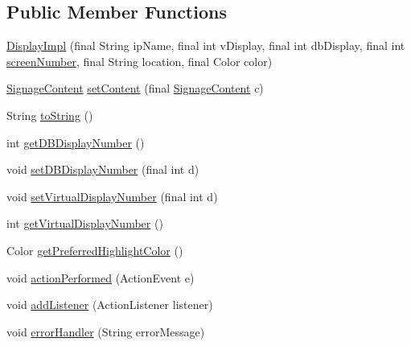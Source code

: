 \subsection*{Public Member Functions}
\begin{DoxyCompactItemize}
\item 
\hyperlink{classgov_1_1fnal_1_1ppd_1_1dd_1_1display_1_1DisplayImpl_acb6974b45a772ac261c72c99d0df724b}{Display\-Impl} (final String ip\-Name, final int v\-Display, final int db\-Display, final int \hyperlink{classgov_1_1fnal_1_1ppd_1_1dd_1_1display_1_1DisplayImpl_ace620614bde13cee492129c27f38db4e}{screen\-Number}, final String location, final Color color)
\item 
\hyperlink{interfacegov_1_1fnal_1_1ppd_1_1dd_1_1signage_1_1SignageContent}{Signage\-Content} \hyperlink{classgov_1_1fnal_1_1ppd_1_1dd_1_1display_1_1DisplayImpl_a39ab9312ab3a54c61403b95b30f7d831}{set\-Content} (final \hyperlink{interfacegov_1_1fnal_1_1ppd_1_1dd_1_1signage_1_1SignageContent}{Signage\-Content} c)
\item 
String \hyperlink{classgov_1_1fnal_1_1ppd_1_1dd_1_1display_1_1DisplayImpl_aa322597e9f586d4a5c4dfb78e2b7e793}{to\-String} ()
\item 
int \hyperlink{classgov_1_1fnal_1_1ppd_1_1dd_1_1display_1_1DisplayImpl_a1b294a2d2cd0b9f51e2489b06542a522}{get\-D\-B\-Display\-Number} ()
\item 
void \hyperlink{classgov_1_1fnal_1_1ppd_1_1dd_1_1display_1_1DisplayImpl_a254f9588dac8e1d1cff92e99e103adf2}{set\-D\-B\-Display\-Number} (final int d)
\item 
void \hyperlink{classgov_1_1fnal_1_1ppd_1_1dd_1_1display_1_1DisplayImpl_a3066278882e766ccb363ae335d25dd18}{set\-Virtual\-Display\-Number} (final int d)
\item 
int \hyperlink{classgov_1_1fnal_1_1ppd_1_1dd_1_1display_1_1DisplayImpl_af2f963a8459aee3de743051f96e20bc8}{get\-Virtual\-Display\-Number} ()
\item 
Color \hyperlink{classgov_1_1fnal_1_1ppd_1_1dd_1_1display_1_1DisplayImpl_a1a3e04f0de207a90b4ad2049ac192758}{get\-Preferred\-Highlight\-Color} ()
\item 
void \hyperlink{classgov_1_1fnal_1_1ppd_1_1dd_1_1display_1_1DisplayImpl_a0250d4db31cb4ab616c923285c378251}{action\-Performed} (Action\-Event e)
\item 
void \hyperlink{classgov_1_1fnal_1_1ppd_1_1dd_1_1display_1_1DisplayImpl_ac26f8f2c8b7935585ee0c1f58a56ec4d}{add\-Listener} (Action\-Listener listener)
\item 
void \hyperlink{classgov_1_1fnal_1_1ppd_1_1dd_1_1display_1_1DisplayImpl_aef09d861c01a1be4e14a123d881bd211}{error\-Handler} (String error\-Message)

\end{DoxyCompactItemize}
